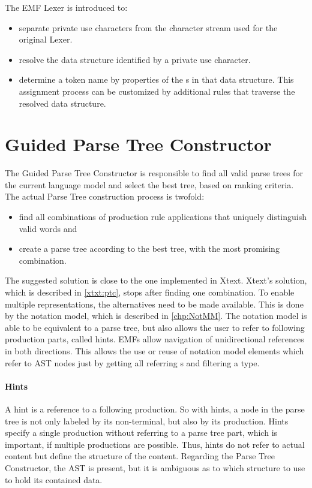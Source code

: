 The EMF Lexer is introduced to:
\begin{itemize}
	\item separate private use characters from the character stream used for the original Lexer.
	\item resolve the data structure identified by a private use character.
	\item determine a token name by properties of the s in that data structure. This assignment process can be customized by additional rules that traverse the resolved data structure.
\end{itemize}



\section{Guided Parse Tree Constructor}
The Guided Parse Tree Constructor is responsible to find all valid parse trees for the current language model and select the best tree, based on ranking criteria. The actual Parse Tree construction process is twofold:
\begin{itemize}
	\item find all combinations of production rule applications that uniquely distinguish valid words and
	\item create a parse tree according to the best tree, with the most promising combination.
\end{itemize}
 
The suggested solution is close to the one implemented in Xtext. Xtext's solution, which is described in \ref{xtxt:ptc}, stops after finding one combination. 
To enable multiple representations, the alternatives need to be made available. This is done by the notation model, which is described in \ref{chp:NotMM}. The notation model is able to be equivalent to a parse tree, but also allows the user to refer to following production parts, called hints. EMFs  allow navigation of unidirectional references in both directions. This allows the use or reuse of notation model elements which refer to AST nodes just by getting all referring s and filtering a type.


\paragraph{Hints}
A hint is a reference to a following production. So with hints, a node in the parse tree is not only labeled by its non-terminal, but also by its production. Hints specify a single production without referring to a parse tree part, which is important, if multiple productions are possible. Thus, hints do not refer to actual content but define the structure of the content. Regarding the Parse Tree Constructor, the AST is present, but it is ambiguous as to which structure to use to hold its contained data.  

